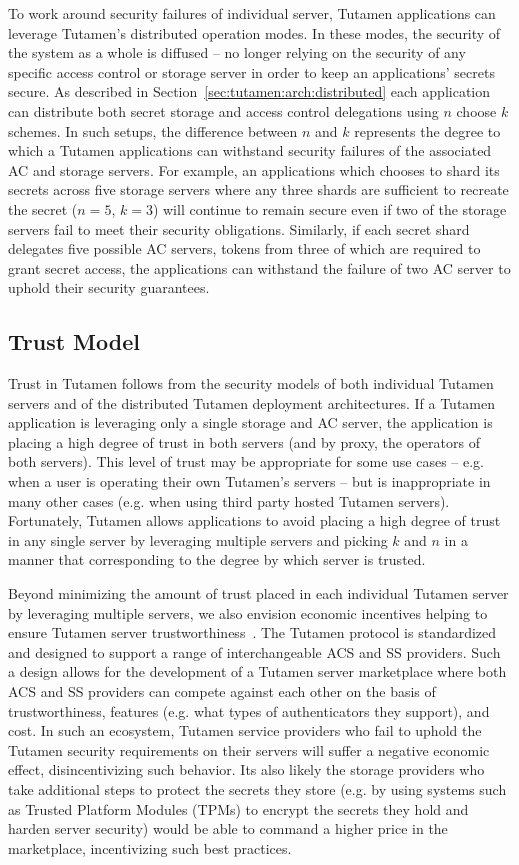 To work around security failures of individual server, Tutamen
applications can leverage Tutamen's distributed operation modes. In
these modes, the security of the system as a whole is diffused -- no
longer relying on the security of any specific access control or
storage server in order to keep an applications' secrets secure. As
described in Section~\ref{sec:tutamen:arch:distributed} each
application can distribute both secret storage and access control
delegations using $n$ choose $k$ schemes. In such setups, the
difference between $n$ and $k$ represents the degree to which a
Tutamen applications can withstand security failures of the associated
AC and storage servers. For example, an applications which chooses to
shard its secrets across five storage servers where any three shards
are sufficient to recreate the secret ($n=5$, $k=3$) will continue to
remain secure even if two of the storage servers fail to meet their
security obligations. Similarly, if each secret shard delegates five
possible AC servers, tokens from three of which are required to grant
secret access, the applications can withstand the failure of two AC
server to uphold their security guarantees.

\subsection{Trust Model}

Trust in Tutamen follows from the security models of both individual
Tutamen servers and of the distributed Tutamen deployment
architectures. If a Tutamen application is leveraging only a single
storage and AC server, the application is placing a high degree of
trust in both servers (and by proxy, the operators of both
servers). This level of trust may be appropriate for some use cases --
e.g. when a user is operating their own Tutamen's servers -- but is
inappropriate in many other cases (e.g. when using third party hosted
Tutamen servers). Fortunately, Tutamen allows applications to avoid
placing a high degree of trust in any single server by leveraging
multiple servers and picking $k$ and $n$ in a manner that
corresponding to the degree by which server is trusted.

Beyond minimizing the amount of trust placed in each individual
Tutamen server by leveraging multiple servers, we also envision
economic incentives helping to ensure Tutamen server
trustworthiness~\cite{anderson2001}. The Tutamen protocol is
standardized and designed to support a range of interchangeable ACS
and SS providers. Such a design allows for the development of a
Tutamen server marketplace where both ACS and SS providers can compete
against each other on the basis of trustworthiness, features
(e.g. what types of authenticators they support), and cost. In such an
ecosystem, Tutamen service providers who fail to uphold the Tutamen
security requirements on their servers will suffer a negative economic
effect, disincentivizing such behavior. Its also likely the storage
providers who take additional steps to protect the secrets they store
(e.g. by using systems such as Trusted Platform Modules (TPMs) to
encrypt the secrets they hold and harden server security) would be
able to command a higher price in the marketplace, incentivizing such
best practices.

